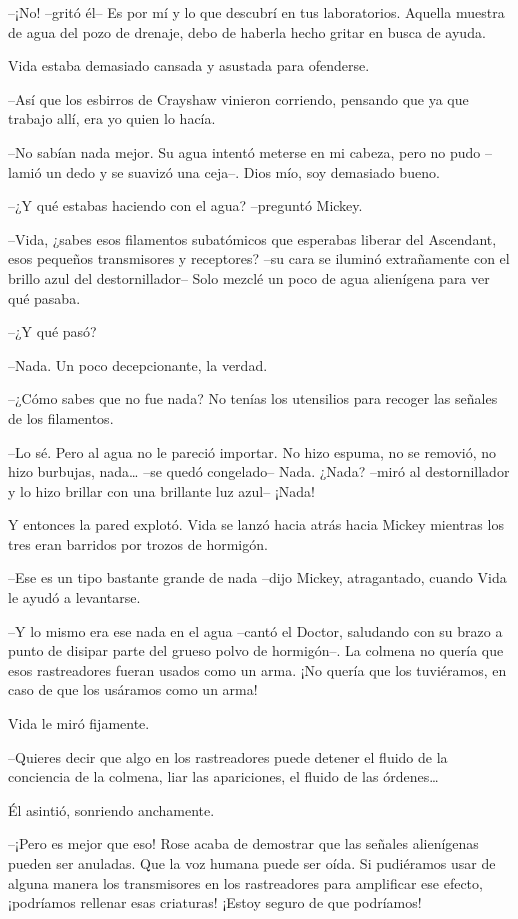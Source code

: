 {--¡No! --gritó él-- Es por mí y lo que descubrí en tus laboratorios.
 Aquella muestra de agua del pozo de drenaje, debo de haberla hecho
gritar en busca de ayuda.}

{Vida estaba demasiado cansada y asustada para ofenderse.}

{--Así que los esbirros de Crayshaw vinieron corriendo, pensando que ya
que trabajo allí, era yo quien lo hacía.}

{--No sabían nada mejor. Su agua intentó meterse en mi cabeza, pero no
 pudo --lamió un dedo y se suavizó una ceja--. Dios mío, soy demasiado
bueno.}

{--¿Y qué estabas haciendo con el agua? --preguntó Mickey.}

{--Vida, ¿sabes esos filamentos subatómicos que esperabas liberar del
 Ascendant, esos pequeños transmisores y receptores? --su cara se iluminó
 extrañamente con el brillo azul del destornillador-- Solo mezclé un poco
de agua alienígena para ver qué pasaba.}

{--¿Y qué pasó?}

{--Nada. Un poco decepcionante, la verdad.}

{--¿Cómo sabes que no fue nada? No tenías los utensilios para recoger
las señales de los filamentos.}

{--Lo sé. Pero al agua no le pareció importar. No hizo espuma, no se
 removió, no hizo burbujas, nada\ldots{} --se quedó congelado-- Nada.
 ¿Nada? --miró al destornillador y lo hizo brillar con una brillante luz
azul-- ¡Nada!}

{Y entonces la pared explotó. Vida se lanzó hacia atrás hacia Mickey
mientras los tres eran barridos por trozos de hormigón.}

{--Ese es un tipo bastante grande de nada --dijo Mickey, atragantado,
cuando Vida le ayudó a levantarse.}

{--Y lo mismo era ese nada en el agua --cantó el Doctor, saludando con
 su brazo a punto de disipar parte del grueso polvo de hormigón--. La
 colmena no quería que esos rastreadores fueran usados como un arma. ¡No
quería que los tuviéramos, en caso de que los usáramos como un arma!}

{Vida le miró fijamente.}

{--Quieres decir que algo en los rastreadores puede detener el fluido de
 la conciencia de la colmena, liar las apariciones, el fluido de las
 órdenes\ldots{}}

{Él asintió, sonriendo anchamente.}

{--¡Pero es mejor que eso! Rose acaba de demostrar que las señales
 alienígenas pueden ser anuladas. Que la voz humana puede ser oída. Si
 pudiéramos usar de alguna manera los transmisores en los rastreadores
 para amplificar ese efecto, ¡podríamos rellenar esas criaturas! ¡Estoy
seguro de que podríamos!}


